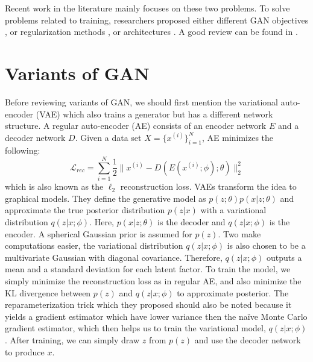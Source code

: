 \documentclass[a4paper,onesided,12pt]{report}
\begin{document}
Recent work in the literature mainly focuses on these two problems. To solve problems related to training, researchers proposed either different GAN objectives \cite{arjovsky2017wasserstein,chen2016infogan,mao2017least,qi2017loss}, or regularization methods \cite{gulrajani2017improved,miyato2018spectral,radford2015unsupervised}, or architectures \cite{brock2018large,donahue2016adversarial,dumoulin2016adversarially,karras2017progressive,karras2019style,radford2015unsupervised,zhang2018self}. A good review can be found in \cite{creswell2018generative,hong2019generative,kurach2018gan}.

\section{Variants of GAN}
\label{sec:variants}

Before reviewing variants of GAN, we should first mention the variational auto-encoder (VAE) \cite{kingma2013auto} which also trains a generator but has a different network structure. A regular auto-encoder (AE) consists of an encoder network $E$ and a decoder network $D$. Given a data set $X=\{x^{(i)}\}_{i=1}^N$, AE minimizes the following:
\begin{equation}
\mathcal{L}_{rec} = \sum_{i=1}^N \frac{1}{2} \| x^{(i)} - D(E(x^{(i)};\phi);\theta) \|_2^2
\label{eq:recons}
\end{equation}
which is also known as the $\ell_2$ reconstruction loss. VAEs transform the idea to graphical models. They define the generative model as $p(z; \theta) p( x | z; \theta)$ and approximate the true posterior distribution $p(z|x)$ with a variational distribution $q(z|x;\phi)$. Here, $p(x | z; \theta)$ is the decoder and $q(z|x;\phi)$ is the encoder. A spherical Gaussian prior is assumed for $p(z)$. Two make computations easier, the variational distribution $q(z|x;\phi)$ is also chosen to be a multivariate Gaussian with diagonal covariance. Therefore, $q(z|x;\phi)$ outputs a mean and a standard deviation for each latent factor. To train the model, we simply minimize the reconstruction loss as in regular AE, and also minimize the KL divergence between $p(z)$ and $q(z|x;\phi)$ to approximate posterior. The reparameterization trick which they proposed \cite{kingma2013auto} should also be noted because it yields a gradient estimator which have lower variance then the na\"{i}ve Monte Carlo gradient estimator, which then helps us to train the variational model, $q(z|x;\phi)$. After training, we can simply draw $z$ from $p(z)$ and use the decoder network to produce $x$.
\end{document}
